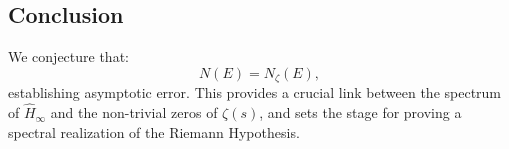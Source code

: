 \subsection*{Conclusion}
We conjecture that:
\[
N(E) = N_\zeta(E),
\]
establishing asymptotic error. This provides a crucial link between the spectrum of \( \hat{H}_\infty \) and the non-trivial zeros of \( \zeta(s) \), and sets the stage for proving a spectral realization of the Riemann Hypothesis.